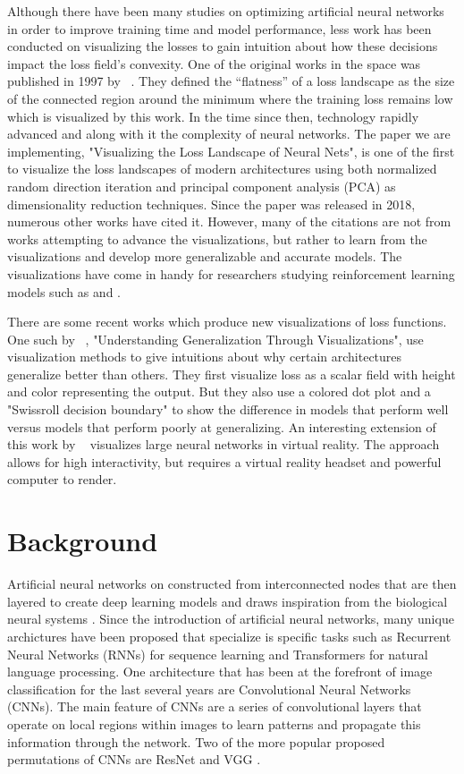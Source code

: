 \documentclass{acmsiggraph}
\begin{document}
Although there have been many studies on optimizing artificial neural networks in order to improve training time and model performance, less work has been conducted on visualizing the losses to gain intuition about how these decisions impact the loss field's convexity. One of the original works in the space was published in 1997 by ~\cite{hochreiter1997flat}. They defined the “flatness” of a loss landscape as the size of the connected region around the minimum where the training loss remains low which is visualized by this work. 
In the time since then, technology rapidly advanced and along with it the complexity of neural networks. The paper we are implementing, "Visualizing the Loss Landscape of Neural Nets", is one of the first to visualize the loss landscapes of modern architectures using both normalized random direction iteration and principal component analysis (PCA) as dimensionality reduction techniques. Since the paper was released in 2018, numerous other works have cited it. However, many of the citations are not from works attempting to advance the visualizations, but rather to learn from the visualizations and develop more generalizable and accurate models.
The visualizations have come in handy for researchers studying reinforcement learning models such as \cite{actor2020} and \cite{plaat2022deep}.

There are some recent works which produce new visualizations of loss functions. One such by ~\cite{pmlr-v137-huang20a}, "Understanding Generalization Through Visualizations", use
visualization methods to give intuitions about why certain architectures generalize better than others. They first visualize loss as a scalar field with height and color representing the output. But they also use a colored dot plot and a "Swissroll decision boundary" to show the difference in models that perform well versus models that perform poorly at generalizing. An interesting extension of this work by ~\cite{linse2022walk} visualizes large neural networks in virtual reality. The approach allows for high interactivity, but requires a virtual reality headset and powerful computer to render.

\section{Background}
\label{sec:intro}

Artificial neural networks on constructed from interconnected nodes that are then layered to create deep learning models and draws inspiration from the biological neural systems \cite{https://doi.org/10.48550/arxiv.1511.08458}. Since the introduction of artificial neural networks, many unique archictures have been proposed that specialize is specific tasks such as Recurrent Neural Networks (RNNs) for sequence learning and Transformers for natural language processing. One architecture that has been at the forefront of image classification for the last several years are Convolutional Neural Networks (CNNs). The main feature of CNNs are a series of convolutional layers that operate on local regions within images to learn patterns and propagate this information through the network. Two of the more popular proposed permutations of CNNs are ResNet and VGG \cite{https://doi.org/10.48550/arxiv.1512.03385}. 
\end{document}
